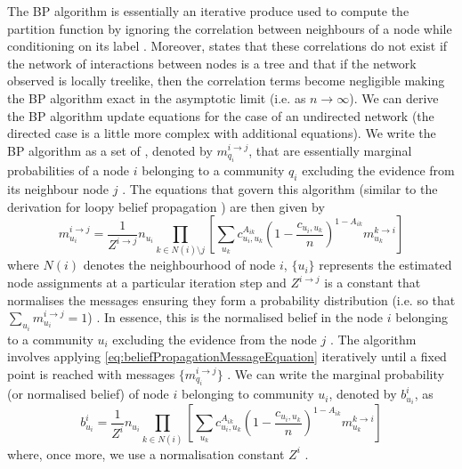 The BP algorithm is essentially an iterative produce used to compute the partition function by ignoring the correlation between neighbours of a node while conditioning on its label \cite{DKM+13}.
Moreover, \cite{DKM+13} states that these correlations do not exist if the network of interactions between nodes is a tree and that if the network observed is locally treelike, then the correlation terms become negligible making the BP algorithm exact in the asymptotic limit (i.e. as $n \rightarrow \infty$).
We can derive the BP algorithm update equations for the case of an undirected network (the directed case is a little more complex with additional equations).
We write the BP algorithm as a set of , denoted by $m_{q_{i}}^{i \rightarrow j}$, that are essentially marginal probabilities of a node $i$ belonging to a community $q_{i}$ excluding the evidence from its neighbour node $j$ \cite{DKM+13}.
The equations that govern this algorithm (similar to the derivation for loopy belief propagation \cite{Gil14a}) are then given by
\begin{equation}
	\label{eq:beliefPropagationMessageEquation}
	m_{u_{i}}^{i \rightarrow j} = \frac{1}{Z^{i \rightarrow j}} n_{u_{i}} \prod_{k \in N(i) \setminus j} \left[ \sum_{u_{k}} c_{u_{i},u_{k}}^{A_{ik}} \left(1 - \frac{c_{u_{i},u_{k}}}{n} \right)^{1-A_{ik}} m_{u_{k}}^{k \rightarrow i} \right]
\end{equation}
where $N(i)$ denotes the neighbourhood of node $i$, $\{ u_{i} \}$ represents the estimated node assignments at a particular iteration step and $Z^{i \rightarrow j}$ is a constant that normalises the messages ensuring they form a probability distribution (i.e. so that $\sum_{u_{i}} m_{u_{i}}^{i \rightarrow j} = 1$) \cite{DKM+13}.
In essence, this is the normalised belief in the node $i$ belonging to a community $u_{i}$ excluding the evidence from the node $j$ \cite{Gil14a}.
The algorithm involves applying \cref{eq:beliefPropagationMessageEquation} iteratively until a fixed point is reached with messages $\{ m_{q_{i}}^{i \rightarrow j}  \}$ \cite{DKM+13}.
We can write the marginal probability (or normalised belief) of node $i$ belonging to community $u_{i}$, denoted by $b_{u_{i}}^{i}$, as
\begin{equation}
	\label{eq:beliefPropagationBeliefEquation}
	b_{u_{i}}^{i} = \frac{1}{Z^{i}} n_{u_{i}} \prod_{k \in N(i)} \left[ \sum_{u_{k}} c_{u_{i},u_{k}}^{A_{ik}} \left(1 - \frac{c_{u_{i},u_{k}}}{n} \right)^{1-A_{ik}} m_{u_{k}}^{k \rightarrow i} \right]
\end{equation}
where, once more, we use a normalisation constant $Z^{i}$ \cite{DKM+13}.

